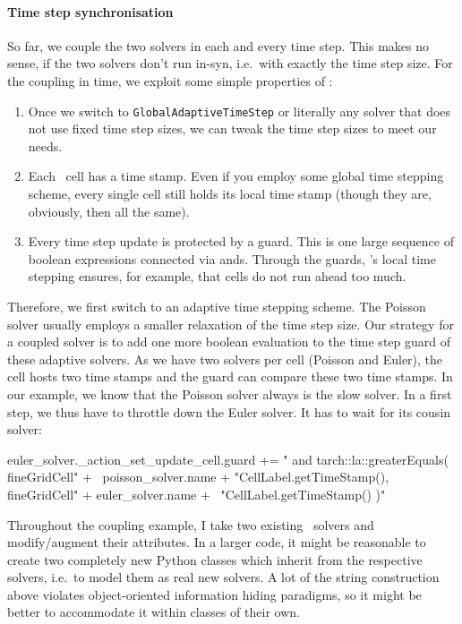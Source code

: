 \paragraph{Time step synchronisation}
%
%
%
So far, we couple the two solvers in each and every time step.
This makes no sense, if the two solvers don't run in-syn, i.e.~with exactly the
time step size.
For the coupling in time, we exploit some simple properties of \ExaHyPE:
\begin{enumerate}
  \item Once we switch to \texttt{GlobalAdaptiveTimeStep} or literally any
  solver that does not use fixed time step sizes, we can tweak the time step
  sizes to meet our needs.
  \item Each \ExaHyPE\ cell has a time stamp. Even if you employ some global
  time stepping scheme, every single cell still holds its local time stamp
  (though they are, obviously, then all the same).
  \item Every time step update is protected by a guard. This is one large
  sequence of boolean expressions connected via ands. Through the guards,
  \ExaHyPE's local time stepping ensures, for example, that cells do not run
  ahead too much.
\end{enumerate}


\noindent
Therefore, we first switch to an adaptive time stepping scheme.
The Poisson solver usually employs a smaller relaxation of the time step size.
Our strategy for a coupled solver is to add one more boolean evaluation to the
time step guard of these adaptive solvers. 
As we have two solvers per cell (Poisson and Euler), the cell hosts two time
stamps and the guard can compare these two time stamps.
In our example, we know that the Poisson solver always is the slow solver. 
In a first step, we thus have to throttle down the Euler solver.
It has to wait for its cousin solver:

\begin{code}
euler_solver._action_set_update_cell.guard += " and tarch::la::greaterEquals( fineGridCell" + \
  poisson_solver.name + "CellLabel.getTimeStamp(), fineGridCell" + euler_solver.name + \
  "CellLabel.getTimeStamp() )"
\end{code}


\begin{remark}
 Throughout the coupling example, I take two existing \ExaHyPE\ solvers and
 modify/augment their attributes. In a larger code, it might be reasonable to
 create two completely new Python classes which inherit from the respective
 solvers, i.e.~to model them as real new solvers.
 A lot of the string construction above violates object-oriented information
 hiding paradigms, so it might be better to accommodate it within classes of
 their own.
\end{remark}


